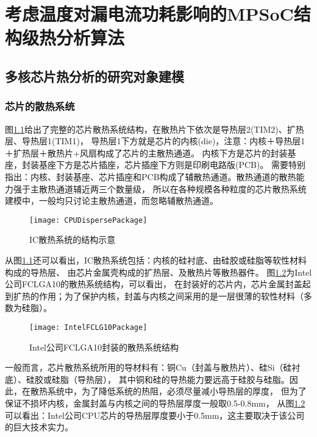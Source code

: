 

\chapter{考虑温度对漏电流功耗影响的MPSoC结构级热分析算法}
\label{cha:SSTA}


\section{多核芯片热分析的研究对象建模}
\label{sec:SSTAbasic}

\subsection{芯片的散热系统}
图\ref{fig:cpu-disperse-package}给出了完整的芯片散热系统结构，在散热片下依次是导热层2(TIM2)、扩热层、导热层1(TIM1)， 导热层1下方就是芯片的内核(die)，注意：内核＋导热层1＋扩热层＋散热片+风扇构成了芯片的主散热通道。 内核下方是芯片的封装基座，封装基座下方是芯片插座，芯片插座下方则是印刷电路版(PCB)。 需要特别指出：内核、封装基座、芯片插座和PCB构成了辅散热通道。散热通道的散热能力强于主散热通道辅近两三个数量级， 所以在各种规模各种粒度的芯片散热系统建模中，一般均只讨论主散热通道，而忽略辅散热通道。

\begin{figure}[H]
  \centering
  \texttt{[image: CPUDispersePackage]}
  \caption{IC散热系统的结构示意}
  \label{fig:cpu-disperse-package}
\end{figure}

从图\ref{fig:cpu-disperse-package}还可以看出，IC散热系统包括：内核的硅衬底、由硅胶或硅脂等软性材料构成的导热层、 由芯片金属壳构成的扩热层、及散热片等散热器件。 图\ref{fig:intel-fclg-package}为Intel公司FCLGA10的散热系统结构，可以看出， 在封装好的芯片内，芯片金属封盖起到扩热的作用；为了保护内核，封盖与内核之间采用的是一层很薄的软性材料（多数为硅脂）。

\begin{figure}[H]
  \centering
  \texttt{[image: IntelFCLG10Package]}
  \caption{Intel公司FCLGA10封装的散热系统结构}
  \label{fig:intel-fclg-package}
\end{figure}

一般而言，芯片散热系统所用的导材料有：铜Cu（封盖与散热片）、硅Si（硅衬底）、硅胶或硅脂（导热层）， 其中铜和硅的导热能力要远高于硅胶与硅脂。因此，在散热系统中，为了降低系统的热阻，必须尽量减小导热层的厚度， 但为了保证不损坏内核，金属封盖与内核之间的导热层厚度一般取0.5-0.8mm， 从图\ref{fig:intel-fclg-package}可以看出：Intel公司CPU芯片的导热层厚度要小于0.5mm，这主要取决于该公司的巨大技术实力。

